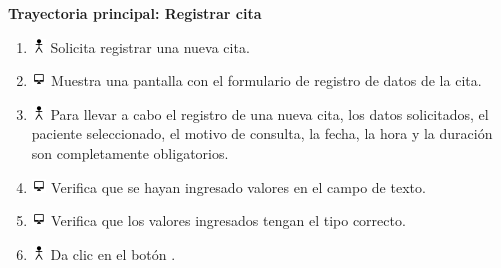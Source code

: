 \textbf{Trayectoria principal: Registrar cita}  
\begin{enumerate}
\item \includegraphics[height=1em]{pictures/actor.png} Solicita registrar una nueva cita.
\item \includegraphics[height=1em]{pictures/sistema.png} Muestra una pantalla con el formulario de registro de datos de la cita.
\item \includegraphics[height=1em]{pictures/actor.png} Para llevar a cabo el registro de una nueva cita, los datos solicitados, el paciente seleccionado, el motivo de consulta, la fecha, la hora y la duración son completamente obligatorios.
\item \includegraphics[height=1em]{pictures/sistema.png} Verifica que se hayan ingresado valores en el campo de texto.
\item \includegraphics[height=1em]{pictures/sistema.png} Verifica que los valores ingresados tengan el tipo correcto.
\item \includegraphics[height=1em]{pictures/actor.png} Da clic en el botón .
\end{enumerate} \bigskip

